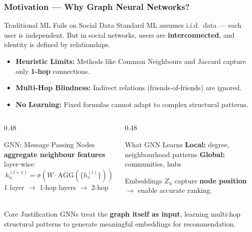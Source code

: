 \documentclass[10pt,aspectratio=43]{beamer}
\begin{document}
\begin{frame}
\frametitle{Motivation --- Why Graph Neural Networks?}

\begin{block}{Traditional ML Fails on Social Data}
\small
Standard ML assumes \alert{i.i.d.\ data} --- each user is independent.
But in social networks, users are \textbf{interconnected}, and identity is defined by relationships.
\end{block}

\vspace{0.3em}

\begin{itemize}
  \small
  \item \alert{\textbf{Heuristic Limits:}} Methods like Common Neighbours and Jaccard capture only \textbf{1-hop} connections.
  \item \alert{\textbf{Multi-Hop Blindness:}} Indirect relations (friends-of-friends) are ignored.
  \item \alert{\textbf{No Learning:}} Fixed formulas cannot adapt to complex structural patterns.
\end{itemize}

\vspace{0.2em}

\begin{columns}[T]
\begin{column}{0.48\textwidth}
\begin{exampleblock}{GNN: Message Passing}
\small
Nodes \textbf{aggregate neighbour features} layer-wise:  
\[
h_u^{(l+1)} = \sigma\!\left(W \cdot \text{AGG}(\{h_v^{(l)}\})\right)
\]
1 layer $\rightarrow$ 1-hop  layers $\rightarrow$ 2-hop
\end{exampleblock}
\end{column}
\begin{column}{0.48\textwidth}
\begin{exampleblock}{What GNN Learns}
\small
\textbf{Local:} degree, neighbourhood patterns  
\textbf{Global:} communities, hubs  

Embeddings $Z_u$ capture \textbf{node position} $\rightarrow$ enable accurate ranking.
\end{exampleblock}
\end{column}
\end{columns}

\vspace{0.2em}

\begin{alertblock}{Core Justification}
\small
GNNs treat the \textbf{graph itself as input}, learning multi-hop structural patterns to generate meaningful embeddings for recommendation.
\end{alertblock}

\end{frame}
\end{document}

